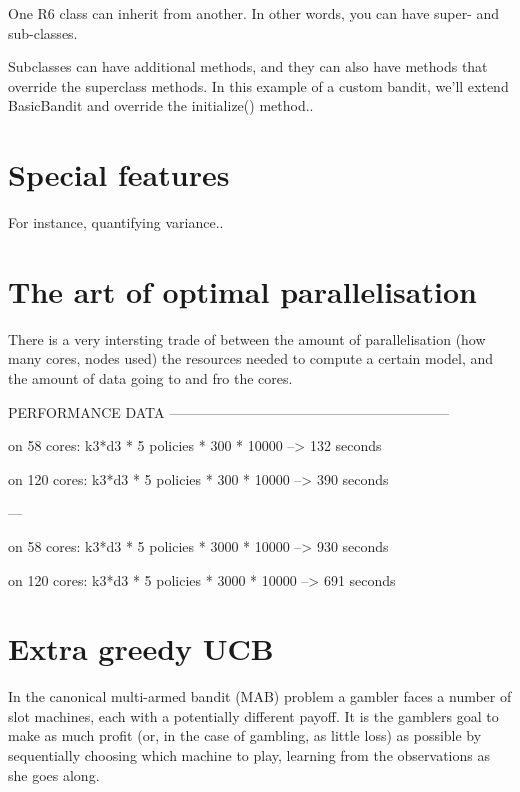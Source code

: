 \documentclass[nojss]{jss}
\begin{document}
One R6 class can inherit from another. In other words, you can have super- and sub-classes.

Subclasses can have additional methods, and they can also have methods that override the superclass methods. In this example of a custom  bandit, we’ll extend BasicBandit and override the initialize() method..

\section{Special features}

For instance, quantifying variance..

\section{The art of optimal parallelisation}

There is a very intersting trade of between the amount of parallelisation (how many cores, nodes used) the resources needed to compute a certain model, and the amount of data going to and fro the cores.

PERFORMANCE DATA  ------------------------------------------------------------

on 58  cores:    k3*d3 * 5 policies * 300  * 10000 --\textgreater{} 132 seconds

on 120 cores:    k3*d3 * 5 policies * 300  * 10000 --\textgreater{} 390 seconds

---

on 58  cores:    k3*d3 * 5 policies * 3000 * 10000 --\textgreater{} 930 seconds

on 120 cores:    k3*d3 * 5 policies * 3000 * 10000 --\textgreater{} 691 seconds



\section{Extra greedy UCB}

In the canonical multi-armed bandit (MAB) problem a gambler faces a number of slot machines, each with a potentially different payoff. It is the gamblers goal to make as much profit (or, in the case of gambling, as little loss) as possible by sequentially choosing which machine to play, learning from the observations as she goes along.
\end{document}
